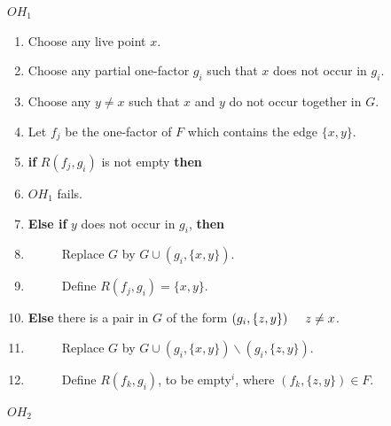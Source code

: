 \documentclass[
  12pt,
  a4paper]{book}
\begin{document}
\(OH_1\)

\begin{enumerate}
\def\labelenumi{\arabic{enumi}.}
\item
  Choose any live point \(x\).
\item
  Choose any partial one-factor \(g_i\) such that \(x\) does not occur in
  \(g_i\).
\item
  Choose any \(y \neq x\) such that \(x\) and \(y\) do not occur together in
  \(G\).
\item
  Let \(f_j\) be the one-factor of \(F\) which contains the edge
  \(\{x,y\}\).
\item
  \textbf{if} \(R(f_j,g_i)\) is not empty \textbf{then}
\item
  \(OH_1\) fails.
\item
  \textbf{Else if} \(y\) does not occur in \(g_i\), \textbf{then}
\item
  \(\hspace{1cm}\) Replace \(G\) by \(G \cup (g_i,\{x,y\})\).
\item
  \(\hspace{1cm}\) Define \(R(f_j,g_i)=\{x,y\}\).
\item
  \textbf{Else} there is a pair in \(G\) of the form
  \((g_i,\{z,y\}) \hspace{0.5cm} z \neq x\).
\item
  \(\hspace{1cm}\) Replace \(G\) by
  \(G \cup (g_i,\{x,y\}) \backslash (g_i,\{z,y\})\).
\item
  \(\hspace{1cm}\) Define \(R(f_k,g_i)\), to be empty\(^i\), where
  \((f_k,\{z,y\}) \in F\).
\end{enumerate}

\(OH_2\)
\end{document}
